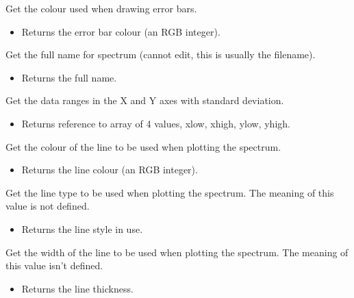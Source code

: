 \begin{desc}Get the colour used when drawing error bars.
\begin{itemize}
\item{Returns the error bar colour (an RGB integer). }
\end{itemize}
\end{desc}

\begin{desc}Get the full name for spectrum (cannot edit, this is usually
 the filename).
\begin{itemize}
\item{Returns the full name. }
\end{itemize}
\end{desc}

\begin{desc}Get the data ranges in the X and Y axes with standard
 deviation.
\begin{itemize}
\item{Returns reference to array of 4 values, xlow, xhigh, ylow, yhigh. }
\end{itemize}
\end{desc}

\begin{desc}Get the colour of the line to be used when plotting the
 spectrum.
\begin{itemize}
\item{Returns the line colour (an RGB integer). }
\end{itemize}
\end{desc}

\begin{desc}Get the line type to be used when plotting the spectrum.
 The meaning of this value is not defined.
\begin{itemize}
\item{Returns the line style in use. }
\end{itemize}
\end{desc}

\begin{desc}Get the width of the line to be used when plotting the
 spectrum. The meaning of this value isn't defined.
\begin{itemize}
\item{Returns the line thickness. }
\end{itemize}
\end{desc}

